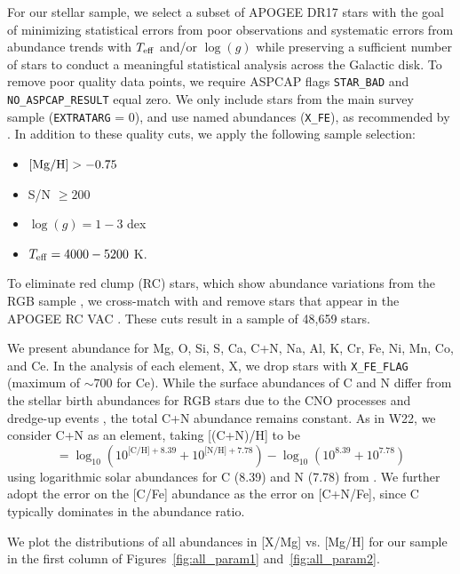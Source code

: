 \documentclass[modern]{aastex631}
\newcommand{\mgh}{[{\rm Mg}/{\rm H}]}
\newcommand{\logg}{\log(g)}
\newcommand{\teff}{T_{\rm eff}}
\begin{document}
For our stellar sample, we select a subset of APOGEE DR17 stars with the goal of minimizing statistical errors from poor observations and systematic errors from abundance trends with $\teff$ and/or $\logg$ while preserving a sufficient number of stars to conduct a meaningful statistical analysis across the Galactic disk. To remove poor quality data points, we require ASPCAP flags \texttt{STAR\_BAD} and \texttt{NO\_ASPCAP\_RESULT} equal zero. We only include stars from the main survey sample (\texttt{EXTRATARG} = 0), and use named abundances (\texttt{X\_FE}), as recommended by \citet{jonsson2020}. In addition to these quality cuts, we apply the following sample selection:
\begin{itemize}
\itemsep0em
    \item $\mgh > -0.75$
    \item S/N $\geq 200$
    \item $\logg = 1-3$ dex
    \item $\teff = 4000-5200$ K.
\end{itemize}
To eliminate red clump (RC) stars, which show abundance variations from the RGB sample \citep{vincenzo2021a}, we cross-match with and remove stars that appear in the APOGEE RC VAC \citep{bovy2014}. These cuts result in a sample of 48,659 stars.  

We present abundance for Mg, O, Si, S, Ca, C+N, Na, Al, K, Cr, Fe, Ni, Mn, Co, and Ce. In the analysis of each element, X, we drop stars with \texttt{X\_FE\_FLAG} (maximum of $\sim 700$ for Ce). While the surface abundances of C and N differ from the stellar birth abundances for RGB stars due to the CNO processes and dredge-up events \citep{iben1965, shetrone2019}, the total C+N abundance remains constant. As in W22, we consider C+N as an element, taking [(C+N)/H] to be 
\begin{equation}
    [\text{C+N}/\text{H}] = \log_{10}(10^{\text{[C/H]}+8.39} + 10^{\text{[N/H]}+7.78}) - \log_{10}(10^{8.39} + 10^{7.78})
\end{equation}
using logarithmic solar abundances for C (8.39) and N (7.78) from \citet{grevesse2007}. We further adopt the error on the [C/Fe] abundance as the error on [C+N/Fe], since C typically dominates in the abundance ratio.

We plot the distributions of all abundances in [X/Mg] vs. [Mg/H] for our sample in the first column of Figures~\ref{fig:all_param1} and~\ref{fig:all_param2}. 
\end{document}
